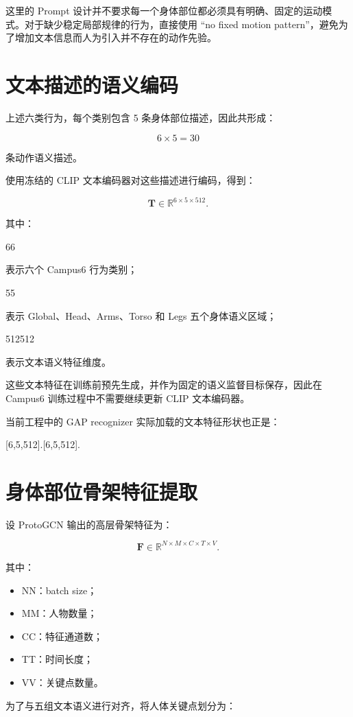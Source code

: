这里的 Prompt 设计并不要求每一个身体部位都必须具有明确、固定的运动模式。对于缺少稳定局部规律的行为，直接使用 “no fixed motion pattern”，避免为了增加文本信息而人为引入并不存在的动作先验。

\section{文本描述的语义编码}

上述六类行为，每个类别包含 5 条身体部位描述，因此共形成：

\[
6\times5=30
\]

条动作语义描述。

使用冻结的 CLIP 文本编码器对这些描述进行编码，得到：

\[
\mathbf T
\in
\mathbb R^{6\times5\times512}.
\]

其中：

66

表示六个 Campus6 行为类别；

55

表示 Global、Head、Arms、Torso 和 Legs 五个身体语义区域；

512512

表示文本语义特征维度。

这些文本特征在训练前预先生成，并作为固定的语义监督目标保存，因此在 Campus6 训练过程中不需要继续更新 CLIP 文本编码器。

当前工程中的 GAP recognizer 实际加载的文本特征形状也正是：

[6,5,512].[6,5,512].


\section{身体部位骨架特征提取}

设 ProtoGCN 输出的高层骨架特征为：

\[
\mathbf F
\in
\mathbb R^{N\times M\times C\times T\times V}.
\]

其中：

\begin{itemize}
\item NN：batch size；
\item MM：人物数量；
\item CC：特征通道数；
\item TT：时间长度；
\item VV：关键点数量。
\end{itemize}

为了与五组文本语义进行对齐，将人体关键点划分为：

